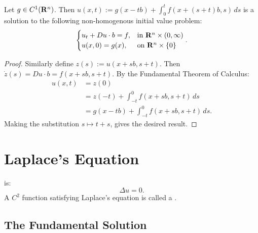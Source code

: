 \begin{theorem}
	Let $g \in C^1(\mathbf{R}^n)$. Then $u(x,t) := g(x-tb) + \int_{0}^{t} f(x+(s+t)b,s)\,ds$ is a solution to the following non-homogenous initial value problem:
	\[
		\begin{cases}
			u_t + Du \cdot b = f, & \text{in }\mathbf{R}^n \times (0,\infty) \\
			u(x,0) = g(x),& \text{on }\mathbf{R}^n \times \{0\}
		\end{cases}.
	\] 
\end{theorem}
	\begin{proof}
		Similarly define $z(s) := u(x+sb,s+t)$. Then $\dot{z}(s) = Du \cdot b = f(x+sb,s+t)$. By the Fundamental Theorem of Calculus:
		\begin{align*}
			u(x,t)
			&= z(0) \\
			&= z(-t) + \int_{-t}^{0} f(x+sb,s+t)\,ds \\
			&= g(x-tb) + \int_{-t}^{0} f(x+sb,s+t)\,ds.
		\end{align*}
		Making the substitution $s \mapsto t+s$, gives the desired result.
	\end{proof}

\section{Laplace's Equation}	

\begin{definition}
	 is:
	\[
		\Delta u = 0.
	\] 
	A $C^2$ function satisfying Laplace's equation is called a . 
\end{definition}

\subsection{The Fundamental Solution}


